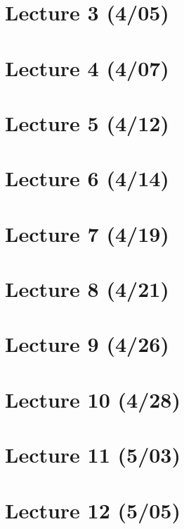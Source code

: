 \section{Lecture 3 (4/05)}

\newpage

\section{Lecture 4 (4/07)}

\newpage

\section{Lecture 5 (4/12)}

\newpage

\section{Lecture 6 (4/14)}

\newpage

\section{Lecture 7 (4/19)}

\newpage

\section{Lecture 8 (4/21)}

\newpage

\section{Lecture 9 (4/26)}

\newpage

\section{Lecture 10 (4/28)}

\newpage

\section{Lecture 11 (5/03)}

\newpage

\section{Lecture 12 (5/05)}

\newpage

